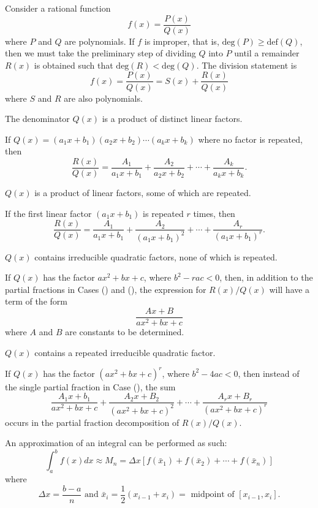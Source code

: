 \documentclass[a4paper,11pt]{article}
\begin{document}
\begin{outline}
    Consider a rational function \[f(x)=\frac{P(x)}{Q(x)}\] where \(P\) and \(Q\) are polynomials. If \(f\) is
    improper, that is, \(\text{deg}(P)\geq\text{def}(Q)\), then we must take the preliminary step of dividing
    \(Q\) into \(P\) until a remainder \(R(x)\) is obtained such that \(\text{deg}(R)<\text{deg}(Q)\). The division
    statement is \[f(x)=\frac{P(x)}{Q(x)}=S(x)+\frac{R(x)}{Q(x)}\] where \(S\) and \(R\) are also polynomials.
    
    \begin{proofcases}
      \item 
        The denominator \(Q(x)\) is a product of distinct linear factors.
        
        If \(Q(x) = (a_1x+b_1)(a_2x+b_2)\cdots(a_kx+b_k)\) where no factor is repeated, then \[ \frac{R(x)}{Q(x)}
        = \frac{A_1}{a_1x+b_1} + \frac{A_2}{a_2x+b_2} + \cdots + \frac{A_k}{a_kx+b_k}\text{.} \]
      \item
        \(Q(x)\) is a product of linear factors, some of which are repeated.
        
        If the first linear factor \((a_1x+b_1)\) is repeated \(r\) times, then \[ \frac{R(x)}{Q(x)} = 
        \frac{A_1}{a_1x+b_1} + \frac{A_2}{(a_1x+b_1)^2} + \cdots + \frac{A_r}{(a_1x+b_1)^r}\text{.} \]
      \item
        \(Q(x)\) contains irreducible quadratic factors, none of which is repeated.
        
        If \(Q(x)\) has the factor \(ax^2+bx+c\), where \(b^2-rac < 0\), then, in addition to the partial fractions
        in Cases () and (), the expression for \(R(x)/Q(x)\) will have a term
        of the form \[\frac{Ax+B}{ax^2+bx+c}\] where \(A\) and \(B\) are constants to be determined.
      \item
        \(Q(x)\) contains a repeated irreducible quadratic factor.
        
        If \(Q(x)\) has the factor \((ax^2+bx+c)^r\), where \(b^2-4ac < 0\), then instead of the single partial
        fraction in Case (), the sum \[\frac{A_1x+b_1}{ax^2+bx+c}+\frac{A_2x+B_2}{(ax^2+bx+c)^2}+
        \cdots+\frac{A_rx+B_r}{(ax^2+bx+c)^r}\] occurs in the partial fraction decomposition of \(R(x)/Q(x)\).
      
    \end{proofcases}
    
    An approximation of an integral can be performed as such:
    \[
      \int_a^bf(x)dx \approx M_n = \Delta{x}\left[f(\bar{x}_1) + f(\bar{x}_2) + \cdots + f(\bar{x}_n)\right]
    \]
    where
    \[
      \Delta{x}=\frac{b-a}{n}\text{ and }\bar{x}_i=\frac{1}{2}(x_{i-1}+x_i)=\text{ midpoint of }[x_{i-1}, x_i]\text{.}
    \]
    

\end{outline}
\end{document}
